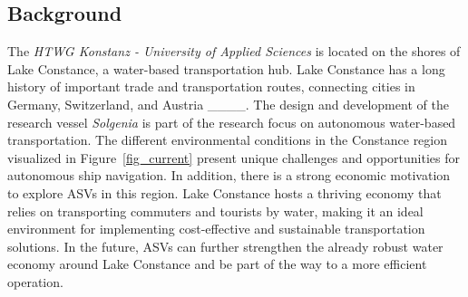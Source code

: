 \subsection{Background}
The \textit{HTWG Konstanz - University of Applied Sciences} is located on the shores of Lake Constance, a water-based transportation hub. Lake Constance has a long history of important trade and transportation routes, connecting cities in Germany, Switzerland, and Austria ____. %
The design and development of the research vessel \textit{Solgenia} is part of the research focus on autonomous water-based transportation. The different environmental conditions in the Constance region visualized in Figure~\ref{fig_current} present unique challenges and opportunities for autonomous ship navigation. 
In addition, there is a strong economic motivation to explore ASVs in this region. Lake Constance hosts a thriving economy that relies on transporting commuters and tourists by water, making it an ideal environment for implementing cost-effective and sustainable transportation solutions.  In the future, ASVs can further strengthen the already robust water economy around Lake Constance and be part of the way to a more efficient operation.

